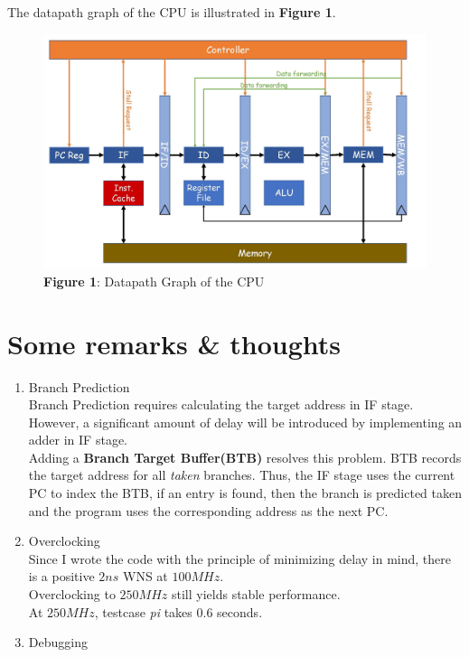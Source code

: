 \documentclass[UTF8, 12pt]{ctexart}
\begin{document}
            The datapath graph of the CPU is illustrated in \textbf{Figure 1}.
            \begin{figure}[h]
                \includegraphics[scale=0.4]{datapath_diagram.jpg}
                \centering
                \caption*{\textbf{Figure 1}: Datapath Graph of the CPU}
            \end{figure}
        \section{Some remarks \& thoughts}
        \begin{enumerate}[label=(\arabic*)]
            \item Branch Prediction \\
                Branch Prediction requires calculating the target address in IF stage. However, a significant amount of delay will be introduced by implementing an adder in IF stage.\\
                Adding a \textbf{Branch Target Buffer(BTB)} resolves this problem. BTB records the target address for all \textit{taken} branches. Thus, the IF stage uses the current PC to index the BTB,
                if an entry is found, then the branch is predicted taken and the program uses the corresponding address as the next PC. 
            \item Overclocking \\
                Since I wrote the code with the principle of minimizing delay in mind, there is a positive $2ns$ WNS at $100MHz$. \\
                Overclocking to $250MHz$ still yields stable performance. \\
                At $250MHz$, testcase \textit{pi} takes $0.6$ seconds.
            \item Debugging \\
        \end{enumerate}
\end{document}
